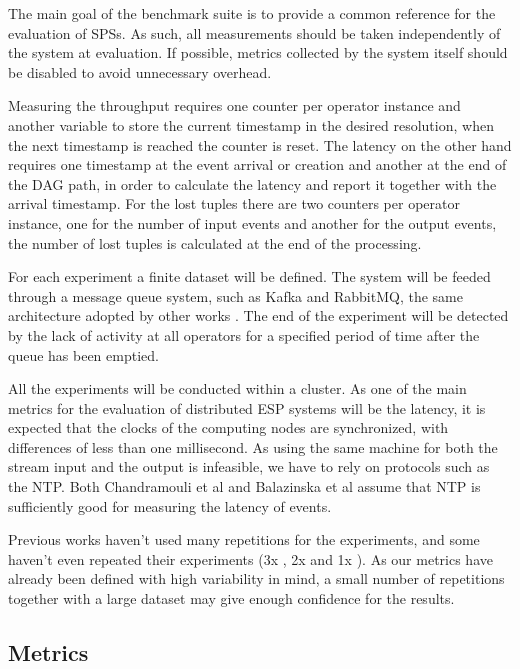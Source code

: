 \documentclass[ppgc,diss,english]{iiufrgs}
\begin{document}
The main goal of the benchmark suite is to provide a common reference for the evaluation of SPSs. As such, all measurements should be taken independently of the system at evaluation. If possible, metrics collected by the system itself should be disabled to avoid unnecessary overhead.

Measuring the throughput requires one counter per operator instance and another variable to store the current timestamp in the desired resolution, when the next timestamp is reached the counter is reset. The latency on the other hand requires one timestamp at the event arrival or creation and another at the end of the DAG path, in order to calculate the latency and report it together with the arrival timestamp. For the lost tuples there are two counters per operator instance, one for the number of input events and another for the output events, the number of lost tuples is calculated at the end of the processing.


For each experiment a finite dataset will be defined. The system will be feeded through a message queue system, such as Kafka and RabbitMQ, the same architecture adopted by other works \cite{chardonnens2013big, lim2013execution, wang2013cluster, sawant2013big}. The end of the experiment will be detected by the lack of activity at all operators for a specified period of time after the queue has been emptied.

All the experiments will be conducted within a cluster. As one of the main metrics for the evaluation of distributed ESP systems will be the latency, it is expected that the clocks of the computing nodes are synchronized, with differences of less than one millisecond. As using the same machine for both the stream input and the output is infeasible, we have to rely on protocols such as the NTP. Both Chandramouli et al \cite{chandramouli2011accurate} and Balazinska et al \cite{balazinska2008fault} assume that NTP is sufficiently good for measuring the latency of events.

Previous works haven't used many repetitions for the experiments, and some haven't even repeated their experiments (3x \cite{dayarathna2013performance}, 2x \cite{mendes2009performance} and 1x \cite{de2011watershed}). As our metrics have already been defined with high variability in mind, a small number of repetitions together with a large dataset may give enough confidence for the results.

\subsection{Metrics}
\end{document}
